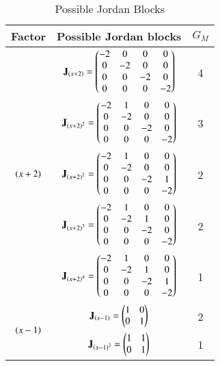 \begin{table*}[ht!]
\begin{center}
\begin{tabular}{|c|c|c|}
\hline
\textbf{Factor} & \textbf{Possible Jordan blocks} & $G_M$ \\[0.5ex]
\hline
\multirow{5}{*}{$\left(x+2\right)$} & 
$\mathbf{J}_{\left(x+2\right)}=\begin{pmatrix}-2&0&0&0\\0&-2&0&0\\0&0&-2&0\\0&0&0&-2\end{pmatrix}$ & 4\\ [0.5ex]  \cline{2-3}
& $\mathbf{J}_{\left(x+2\right)^2}=\begin{pmatrix}-2&1&0&0\\0&-2&0&0\\0&0&-2&0\\0&0&0&-2\end{pmatrix}$ & 3\\  [0.5ex] \cline{2-3}
& $\mathbf{J}_{\left(x+2\right)^2}=\begin{pmatrix}-2&1&0&0\\0&-2&0&0\\0&0&-2&1\\0&0&0&-2\end{pmatrix}$ & 2\\  [0.5ex] \cline{2-3}
& $\mathbf{J}_{\left(x+2\right)^3}=\begin{pmatrix}-2&1&0&0\\0&-2&1&0\\0&0&-2&0\\0&0&0&-2\end{pmatrix}$ & 2\\ [0.5ex]  \cline{2-3}
& $\mathbf{J}_{\left(x+2\right)^4}=\begin{pmatrix}-2&1&0&0\\0&-2&1&0\\0&0&-2&1\\0&0&0&-2\end{pmatrix}$ & 1
\\ [0.5ex] 
\hline
\multirow{2}{*}{$\left(x-1\right)$} & 
$\mathbf{J}_{\left(x-1\right)}=\begin{pmatrix}1&0\\0&1\end{pmatrix}$ &  2\\ [0.5ex]  \cline{2-3}
& $\mathbf{J}_{\left(x-1\right)^2}=\begin{pmatrix}1&1\\0&1\end{pmatrix}$ & 1
\\ [0.5ex] 
\hline
\end{tabular}
\caption{Possible Jordan Blocks}
\label{eq:solutions/7/3/4/table:3}
\end{center}
\end{table*}





